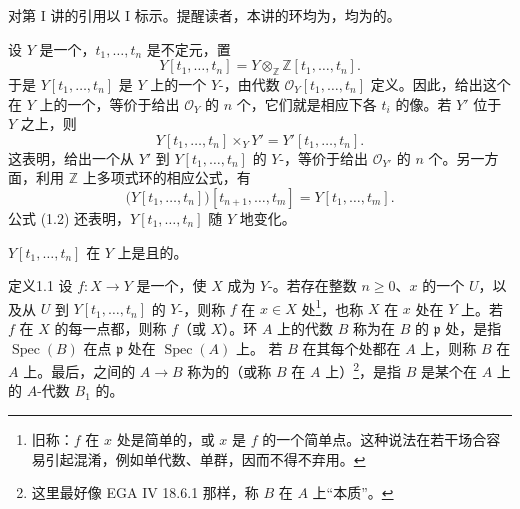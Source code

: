 对第 I 讲的引用以 I 标示。提醒读者，本讲的环均为，均为的。

设 $Y$ 是一个，$t_1,\ldots,t_n$ 是不定元，置
\[
Y[t_1,\ldots,t_n]=Y\otimes_{\mathbb Z}\mathbb Z[t_1,\ldots,t_n].\tag{1.1}
\]
于是 $Y[t_1,\ldots,t_n]$ 是 $Y$ 上的一个 $Y$-，由代数 $\mathcal O_Y[t_1,\ldots,t_n]$ 定义。因此，给出这个在 $Y$ 上的一个，等价于给出 $\mathcal O_Y$ 的 $n$ 个，它们就是相应下各 $t_i$ 的像。若 $Y'$ 位于 $Y$ 之上，则
\[
Y[t_1,\ldots,t_n]\times_Y Y'=Y'[t_1,\ldots,t_n].\tag{1.2}
\]
这表明，给出一个从 $Y'$ 到 $Y[t_1,\ldots,t_n]$ 的 $Y$-，等价于给出 $\mathcal O_{Y'}$ 的 $n$ 个。另一方面，利用 $\mathbb Z$ 上多项式环的相应公式，有
\[
\bigl(Y[t_1,\ldots,t_n]\bigr)[t_{n+1},\ldots,t_m]
=Y[t_1,\ldots,t_m].\tag{1.3}
\]
公式 (1.2) 还表明，$Y[t_1,\ldots,t_n]$ 随 $Y$ 地变化。

$Y[t_1,\ldots,t_n]$ 在 $Y$ 上是且的。

\begin{SGAresult}{定义}{1.1}
设 $f:X\to Y$ 是一个，使 $X$ 成为 $Y$-。若存在整数 $n\geq0$、$x$ 的一个 $U$，以及从 $U$ 到 $Y[t_1,\ldots,t_n]$ 的 $Y$-，则称 $f$ 在 $x\in X$ 处\footnote{旧称：$f$ 在 $x$ 处是简单的，或 $x$ 是 $f$ 的一个简单点。这种说法在若干场合容易引起混淆，例如单代数、单群，因而不得不弃用。}，也称 $X$ 在 $x$ 处在 $Y$ 上。若 $f$ 在 $X$ 的每一点都，则称 $f$（或 $X$）。环 $A$ 上的代数 $B$ 称为在 $B$ 的 $\mathfrak p$ 处，是指 $\operatorname{Spec}(B)$ 在点 $\mathfrak p$ 处在 $\operatorname{Spec}(A)$ 上。
若 $B$ 在其每个处都在 $A$ 上，则称 $B$ 在 $A$ 上。最后，之间的 $A\to B$ 称为的（或称 $B$ 在 $A$ 上）\footnote{这里最好像 EGA IV 18.6.1 那样，称 $B$ 在 $A$ 上“本质”。}，是指 $B$ 是某个在 $A$ 上的 $A$-代数 $B_1$ 的。
\end{SGAresult}

